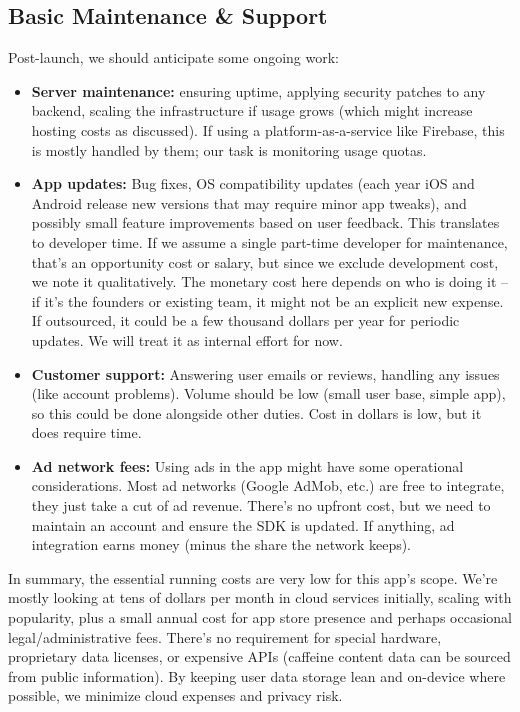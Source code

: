 \documentclass{article}
\begin{document}
\subsection{Basic Maintenance \& Support}
Post-launch, we should anticipate some ongoing work:
\begin{itemize}
    \item \textbf{Server maintenance:} ensuring uptime, applying security patches to any backend, scaling the infrastructure if usage grows (which might increase hosting costs as discussed). If using a platform-as-a-service like Firebase, this is mostly handled by them; our task is monitoring usage quotas.
    \item \textbf{App updates:} Bug fixes, OS compatibility updates (each year iOS and Android release new versions that may require minor app tweaks), and possibly small feature improvements based on user feedback. This translates to developer time. If we assume a single part-time developer for maintenance, that’s an opportunity cost or salary, but since we exclude development cost, we note it qualitatively. The monetary cost here depends on who is doing it – if it’s the founders or existing team, it might not be an explicit new expense. If outsourced, it could be a few thousand dollars per year for periodic updates. We will treat it as internal effort for now.
    \item \textbf{Customer support:} Answering user emails or reviews, handling any issues (like account problems). Volume should be low (small user base, simple app), so this could be done alongside other duties. Cost in dollars is low, but it does require time.
    \item \textbf{Ad network fees:} Using ads in the app might have some operational considerations. Most ad networks (Google AdMob, etc.) are free to integrate, they just take a cut of ad revenue. There’s no upfront cost, but we need to maintain an account and ensure the SDK is updated. If anything, ad integration earns money (minus the share the network keeps).
\end{itemize}

In summary, the essential running costs are very low for this app’s scope. We’re mostly looking at tens of dollars per month in cloud services initially, scaling with popularity, plus a small annual cost for app store presence and perhaps occasional legal/administrative fees. There’s no requirement for special hardware, proprietary data licenses, or expensive APIs (caffeine content data can be sourced from public information). By keeping user data storage lean and on-device where possible, we minimize cloud expenses and privacy risk.
\end{document}
